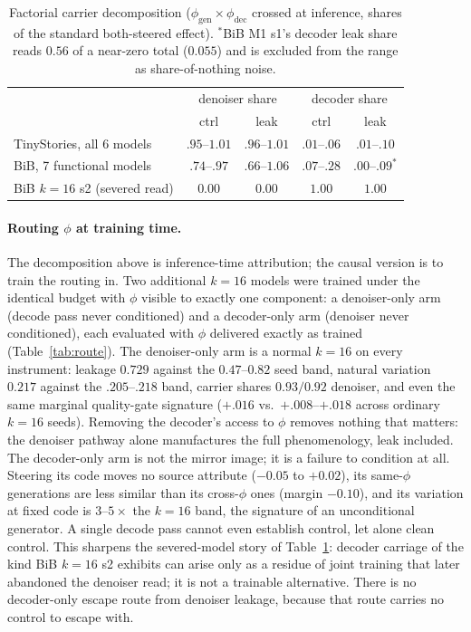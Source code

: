\documentclass[11pt]{article}
\begin{document}
\begin{table}[h]\centering\small
\begin{tabular}{l cc cc}
& \multicolumn{2}{c}{denoiser share} & \multicolumn{2}{c}{decoder share} \\
& ctrl & leak & ctrl & leak \\
\hline
TinyStories, all 6 models        & $.95$--$1.01$ & $.96$--$1.01$ & $.01$--$.06$ & $.01$--$.10$ \\
BiB, 7 functional models         & $.74$--$.97$  & $.66$--$1.06$ & $.07$--$.28$ & $.00$--$.09^{*}$ \\
BiB $k{=}16$ s2 (severed read)   & $0.00$        & $0.00$        & $\mathbf{1.00}$ & $\mathbf{1.00}$ \\
\end{tabular}
\caption{Factorial carrier decomposition ($\phi_{\mathrm{gen}} \times
\phi_{\mathrm{dec}}$ crossed at inference, shares of the standard
both-steered effect). $^{*}$BiB M1 s1's decoder leak share reads $0.56$ of a
near-zero total ($0.055$) and is excluded from the range as
share-of-nothing noise.}
\label{tab:channels}
\end{table}

\paragraph{Routing $\phi$ at training time.} The decomposition above is
inference-time attribution; the causal version is to train the routing
in. Two additional $k{=}16$ models were trained under the identical
budget with $\phi$ visible to exactly one component: a denoiser-only arm
(decode pass never conditioned) and a decoder-only arm (denoiser never
conditioned), each evaluated with $\phi$ delivered exactly as trained
(Table~\ref{tab:route}). The denoiser-only arm is a normal $k{=}16$ on
every instrument: leakage $0.729$ against the $0.47$--$0.82$ seed band,
natural variation $0.217$ against the $.205$--$.218$ band, carrier
shares $0.93/0.92$ denoiser, and even the same marginal quality-gate
signature ($+.016$ vs.\ $+.008$--$+.018$ across ordinary $k{=}16$
seeds). Removing the decoder's access to $\phi$ removes nothing that
matters: the denoiser pathway alone manufactures the full phenomenology,
leak included. The decoder-only arm is not the mirror image; it is a
failure to condition at all. Steering its code moves no source attribute
($-0.05$ to $+0.02$), its same-$\phi$ generations are less similar than
its cross-$\phi$ ones (margin $-0.10$), and its variation at fixed code
is $3$--$5\times$ the $k{=}16$ band, the signature of an unconditional
generator. A single decode pass cannot even establish control, let alone
clean control. This sharpens the severed-model story of
Table~\ref{tab:channels}: decoder carriage of the kind BiB $k{=}16$ s2
exhibits can arise only as a residue of joint training that later
abandoned the denoiser read; it is not a trainable alternative. There is
no decoder-only escape route from denoiser leakage, because that route
carries no control to escape with.
\end{document}

